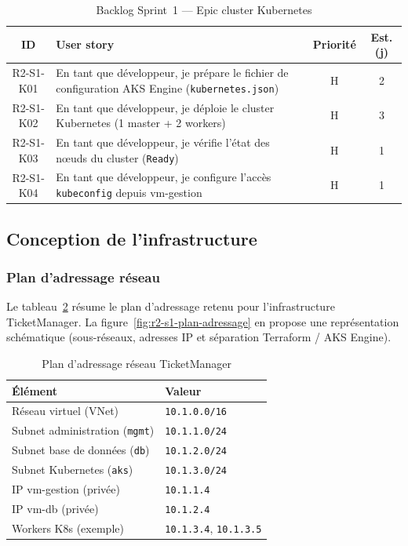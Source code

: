 \begin{table}[H]
\centering
\caption{Backlog Sprint~1 — Epic cluster Kubernetes}
\label{tab:r2-s1-backlog-k8s}
\footnotesize
\renewcommand{\arraystretch}{0.9}
\setlength{\tabcolsep}{4pt}
\begin{tabular}{|c|p{7.8cm}|c|c|}
\hline
\textbf{ID} & \textbf{User story} & \textbf{Priorité} & \textbf{Est. (j)} \\
\hline
R2-S1-K01 &
  En tant que développeur, je prépare le fichier de configuration AKS Engine (\texttt{kubernetes.json}) &
  H & 2 \\
\hline
R2-S1-K02 &
  En tant que développeur, je déploie le cluster Kubernetes (1 master + 2 workers) &
  H & 3 \\
\hline
R2-S1-K03 &
  En tant que développeur, je vérifie l'état des nœuds du cluster (\texttt{Ready}) &
  H & 1 \\
\hline
R2-S1-K04 &
  En tant que développeur, je configure l'accès \texttt{kubeconfig} depuis vm-gestion &
  H & 1 \\
\hline
\end{tabular}
\end{table}


\subsection{Conception de l'infrastructure}

\subsubsection{Plan d'adressage réseau}

Le tableau~\ref{tab:r2-s1-adressage} résume le plan d'adressage retenu pour l'infrastructure
TicketManager. La figure~\ref{fig:r2-s1-plan-adressage} en propose une représentation
schématique (sous-réseaux, adresses IP et séparation Terraform / AKS Engine).

\begin{table}[H]
\centering
\caption{Plan d'adressage réseau TicketManager}
\label{tab:r2-s1-adressage}
\footnotesize
\renewcommand{\arraystretch}{1.1}
\setlength{\tabcolsep}{6pt}
\begin{tabular}{|l|l|}
\hline
\textbf{Élément} & \textbf{Valeur} \\
\hline
Réseau virtuel (VNet) & \texttt{10.1.0.0/16} \\
\hline
Subnet administration (\texttt{mgmt}) & \texttt{10.1.1.0/24} \\
\hline
Subnet base de données (\texttt{db}) & \texttt{10.1.2.0/24} \\
\hline
Subnet Kubernetes (\texttt{aks}) & \texttt{10.1.3.0/24} \\
\hline
IP vm-gestion (privée) & \texttt{10.1.1.4} \\
\hline
IP vm-db (privée) & \texttt{10.1.2.4} \\
\hline
Workers K8s (exemple) & \texttt{10.1.3.4}, \texttt{10.1.3.5} \\
\hline
\end{tabular}
\end{table}

